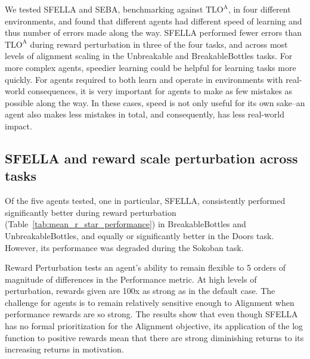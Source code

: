 


We tested SFELLA and SEBA, benchmarking against $\text{TLO}^\text{A}$, in four different environments, and found that different agents had different speed of learning and thus number of errors made along the way. SFELLA performed fewer errors than $\text{TLO}^\text{A}$ during reward perturbation in three of the four tasks, and across most levels of alignment scaling in the Unbreakable and BreakableBottles tasks. For more complex agents, speedier learning could be helpful for learning tasks more quickly. For agents required to both learn and operate in environments with real-world consequences, it is very important for agents to make as few mistakes as possible along the way. In these cases, speed is not only useful for its own sake--an agent also makes less mistakes in total, and consequently, has less real-world impact.

\subsection{SFELLA and reward scale perturbation across tasks}

Of the five agents tested, one in particular, SFELLA, consistently performed significantly better during reward perturbation (Table~\ref{tab:mean_r_star_performance}) in BreakableBottles and UnbreakableBottles, and equally or significantly better in the Doors task. However, its performance was degraded during the Sokoban task.

Reward Perturbation tests an agent's ability to remain flexible to 5 orders of magnitude of differences in the Performance metric. At high levels of perturbation, rewards given are 100x as strong as in the default case. The challenge for agents is to remain relatively sensitive enough to Alignment when performance rewards are so strong. The results show that even though SFELLA has no formal prioritization for the Alignment objective, its application of the log function to positive rewards mean that there are strong diminishing returns to its increasing returns in motivation.

